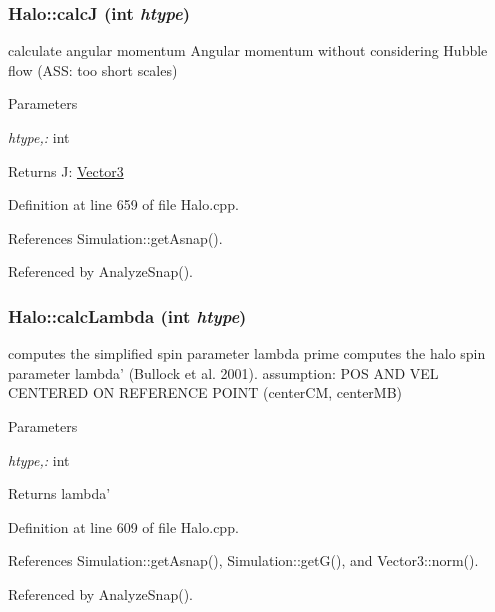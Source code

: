 \subsubsection[{calcJ}]{ Halo::calcJ (int {\em htype})}\label{classHalo_a09e095503613f4fe221f305773d9892d}


calculate angular momentum Angular momentum without considering Hubble flow (ASS: too short scales) 


\begin{DoxyParams}{Parameters}
\item[{\em htype,:}]int \end{DoxyParams}
\begin{DoxyReturn}{Returns}
J: \hyperlink{classVector3}{Vector3} 
\end{DoxyReturn}


Definition at line 659 of file Halo.cpp.



References Simulation::getAsnap().



Referenced by AnalyzeSnap().

\subsubsection[{calcLambda}]{ Halo::calcLambda (int {\em htype})}\label{classHalo_a5b2122f298d378a4f480df2da1c20e98}


computes the simplified spin parameter lambda prime computes the halo spin parameter lambda' (Bullock et al. 2001). assumption: POS AND VEL CENTERED ON REFERENCE POINT (centerCM, centerMB) 


\begin{DoxyParams}{Parameters}
\item[{\em htype,:}]int \end{DoxyParams}
\begin{DoxyReturn}{Returns}
lambda' 
\end{DoxyReturn}


Definition at line 609 of file Halo.cpp.



References Simulation::getAsnap(), Simulation::getG(), and Vector3::norm().



Referenced by AnalyzeSnap().

